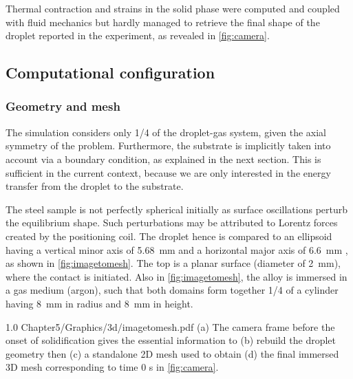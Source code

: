 Thermal contraction and strains in the solid phase were computed and coupled with fluid mechanics but hardly managed to retrieve the final shape of the droplet reported in the experiment, as revealed in \cref{fig:camera}.

\subsection{Computational configuration}

\subsubsection{Geometry and mesh}

The simulation considers only 1/4 of the droplet-gas system, given the axial symmetry of the problem.
Furthermore, the substrate is implicitly taken into account via a boundary condition, as explained in the next section. 
This is sufficient in the current context, because we are only interested in the energy transfer from the droplet to the substrate. 

The steel sample is not perfectly spherical initially as surface oscillations perturb the equilibrium shape. 
Such perturbations may be attributed to Lorentz forces created by the positioning coil. 
The droplet hence is compared to an ellipsoid having
a vertical minor axis of \SI{5.68}{\milli \metre} and a horizontal major axis of \SI{6.6}{\milli \metre} \citep{rivaux_simulation_2011}, as shown in \cref{fig:imagetomesh}.
The top is a planar surface (diameter of \SI{2}{\milli \metre}), where the contact is initiated. 
Also in \cref{fig:imagetomesh}, the alloy is immersed in a gas medium (argon), such that both domains form together 1/4 of a 
cylinder having \SI{8}{\milli \metre} in radius and  \SI{8}{\milli \metre} in height.

\begin{figureth}
{1.0}
{Chapter5/Graphics/3d/imagetomesh.pdf}
{(a) The camera frame before the onset of solidification gives the essential information to (b) 
rebuild the droplet geometry then (c) a standalone 2D mesh used to obtain (d) the final immersed 3D mesh corresponding
to time 0 s in \cref{fig:camera}.}
\label{fig:imagetomesh}
\end{figureth}

